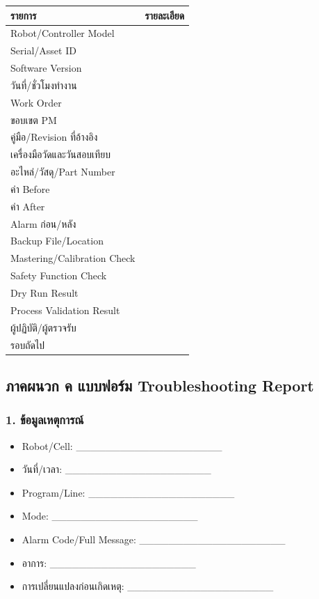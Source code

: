 \begin{table}[htbp]
    \centering
    \begin{tabular}{l l}
        \hline
        \textbf{รายการ} & \textbf{รายละเอียด} \\
        \hline
        Robot/Controller Model &  \\
        Serial/Asset ID &  \\
        Software Version &  \\
        วันที่/ชั่วโมงทำงาน &  \\
        Work Order &  \\
        ขอบเขต PM &  \\
        คู่มือ/Revision ที่อ้างอิง &  \\
        เครื่องมือวัดและวันสอบเทียบ &  \\
        อะไหล่/วัสดุ/Part Number &  \\
        ค่า Before &  \\
        ค่า After &  \\
        Alarm ก่อน/หลัง &  \\
        Backup File/Location &  \\
        Mastering/Calibration Check &  \\
        Safety Function Check &  \\
        Dry Run Result &  \\
        Process Validation Result &  \\
        ผู้ปฏิบัติ/ผู้ตรวจรับ &  \\
        รอบถัดไป &  \\
        \hline
    \end{tabular}
\end{table}



\subsection{ภาคผนวก ค แบบฟอร์ม Troubleshooting Report}

\subsubsection{1. ข้อมูลเหตุการณ์}

\begin{itemize}
    \item Robot/Cell: \_\_\_\_\_\_\_\_\_\_\_\_\_\_\_\_\_\_\_\_
    \item วันที่/เวลา: \_\_\_\_\_\_\_\_\_\_\_\_\_\_\_\_\_\_\_\_
    \item Program/Line: \_\_\_\_\_\_\_\_\_\_\_\_\_\_\_\_\_\_\_\_
    \item Mode: \_\_\_\_\_\_\_\_\_\_\_\_\_\_\_\_\_\_\_\_
    \item Alarm Code/Full Message: \_\_\_\_\_\_\_\_\_\_\_\_\_\_\_\_\_\_\_\_
    \item อาการ: \_\_\_\_\_\_\_\_\_\_\_\_\_\_\_\_\_\_\_\_
    \item การเปลี่ยนแปลงก่อนเกิดเหตุ: \_\_\_\_\_\_\_\_\_\_\_\_\_\_\_\_\_\_\_\_
\end{itemize}

